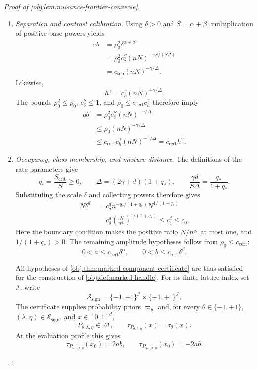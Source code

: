 \begin{proof}[Proof of \cref{obj:lem:nuisance-frontier-converse}]
\begin{enumerate}
\item \textit{Separation and contrast calibration.}
Using \(\delta>0\) and \(S=\alpha+\beta\), multiplication of positive-base powers yields
\[
\begin{aligned}
ab
&=\rho_0^2\delta^{\alpha+\beta}\\
&=\rho_0^2c_\delta^S
  (nN)^{-\gamma S/(S\Delta)}\\
&=c_{\mathrm{sep}}(nN)^{-\gamma/\Delta}.
\end{aligned}
\]
Likewise,
\[
h^\gamma=c_h^\gamma(nN)^{-\gamma/\Delta}.
\]
The bounds \(\rho_0^2\le\rho_0\), \(c_\delta^S\le1\), and \(\rho_0\le c_{\mathrm{cert}}c_h^\gamma\) therefore imply
\[
\begin{aligned}
ab
&=\rho_0^2c_\delta^S(nN)^{-\gamma/\Delta}\\
&\le\rho_0(nN)^{-\gamma/\Delta}\\
&\le c_{\mathrm{cert}}c_h^\gamma(nN)^{-\gamma/\Delta}
=c_{\mathrm{cert}}h^\gamma.
\end{aligned}
\]

\item \textit{Occupancy, class membership, and mixture distance.}
The definitions of the rate parameters give
\[
q_*=\frac{S_{\mathrm{crit}}}{S}\ge0,\qquad
\Delta=(2\gamma+d)(1+q_*),\qquad
\frac{\gamma d}{S\Delta}=\frac{q_*}{1+q_*}.
\]
Substituting the scale \(\delta\) and collecting powers therefore gives
\[
\begin{aligned}
N\delta^d
&=c_\delta^d
  n^{-q_*/(1+q_*)}N^{1/(1+q_*)}\\
&=c_\delta^d
  \left(\frac{N}{n^{q_*}}\right)^{1/(1+q_*)}
\le c_\delta^d\le c_0.
\end{aligned}
\]
Here the boundary condition makes the positive ratio \(N/n^{q_*}\) at most one, and \(1/(1+q_*)>0\). The remaining amplitude hypotheses follow from \(\rho_0\le c_{\mathrm{cert}}\):
\[
0<a\le c_{\mathrm{cert}}\delta^\alpha,\qquad
0<b\le c_{\mathrm{cert}}\delta^\beta.
\]

All hypotheses of \cref{obj:thm:marked-component-certificate} are thus satisfied for the construction of \cref{obj:def:marked-handle}. For its finite lattice index set \(\mathcal I\), write
\[
\mathcal S_{\mathrm{sign}}
=\{-1,+1\}^{\mathcal I}\times\{-1,+1\}^{\mathcal I}.
\]
The certificate supplies probability priors \(\varpi_\theta\) and, for every
\(\theta\in\{-1,+1\}\), \((\lambda,\eta)\in\mathcal S_{\mathrm{sign}}\), and \(x\in[0,1]^d\),
\[
P_{\theta,\lambda,\eta}\in\mathcal M,\qquad
\tau_{P_{\theta,\lambda,\eta}}(x)=\tau_\theta(x).
\]
At the evaluation profile this gives
\[
\tau_{P_{-1,\lambda,\eta}}(x_0)=2ab,\qquad
\tau_{P_{+1,\lambda,\eta}}(x_0)=-2ab.
\]


\end{enumerate}
\end{proof}
